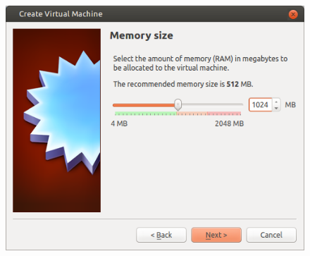 \clearpage
\begin{figure}
                \includegraphics[width=\linewidth]{images/virtualbox_wizard2.png}
\end{figure}

